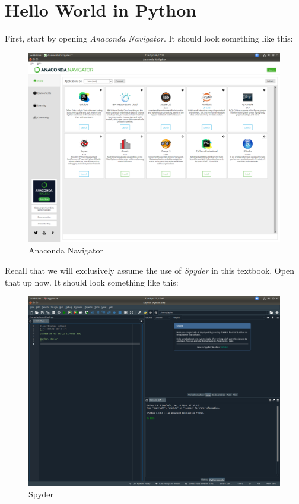 \documentclass[
  12pt,
  krantz2]{krantz}
\begin{document}
\hypertarget{hello-world-in-python}{%
\section{Hello World in Python}\label{hello-world-in-python}}

First, start by opening \emph{Anaconda Navigator}. It should look something like this:

\begin{figure}

{\centering \includegraphics[width=0.8\linewidth]{pics/anaconda_navigator} 

}

\caption{Anaconda Navigator}\label{fig:anaconda-navigator}
\end{figure}

Recall that we will exclusively assume the use of \emph{Spyder} in this textbook. Open that up now. It should look something like this:

\begin{figure}

{\centering \includegraphics[width=0.8\linewidth]{pics/spyder_screenshot} 

}

\caption{Spyder}\label{fig:spyder}
\end{figure}
\end{document}
